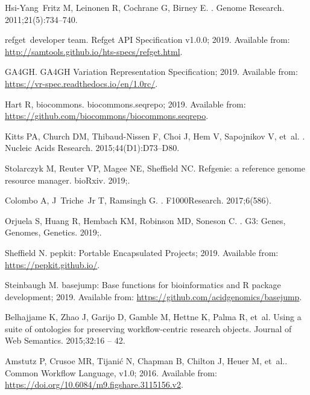 \documentclass[10pt,letterpaper]{article}
\begin{document}
\begin{thebibliography}{10}
Hsi-Yang~Fritz M, Leinonen R, Cochrane G, Birney E.
.
\newblock Genome Research. 2011;21(5):734--740.

refget~developer team. {Refget API Specification v1.0.0}; 2019.
\newblock Available from:
  \url{http://samtools.github.io/hts-specs/refget.html}.

GA4GH. {GA4GH Variation Representation Specification}; 2019.
\newblock Available from: \url{https://vr-spec.readthedocs.io/en/1.0rc/}.

Hart R, biocommons. {biocommons.seqrepo}; 2019.
\newblock Available from:
  \url{https://github.com/biocommons/biocommons.seqrepo}.

Kitts PA, Church DM, Thibaud-Nissen F, Choi J, Hem V, Sapojnikov V, et~al.
.
\newblock Nucleic Acids Research. 2015;44(D1):D73--D80.

Stolarczyk M, Reuter VP, Magee NE, Sheffield NC.
\newblock Refgenie: a reference genome resource manager.
\newblock bioRxiv. 2019;.

Colombo A, J~Triche~Jr T, Ramsingh G.
.
\newblock F1000Research. 2017;6(586).

Orjuela S, Huang R, Hembach KM, Robinson MD, Soneson C.
.
\newblock G3: Genes, Genomes, Genetics. 2019;.

Sheffield N. {pepkit: Portable Encapsulated Projects}; 2019.
\newblock Available from: \url{https://pepkit.github.io/}.

Steinbaugh M. {basejump: Base functions for bioinformatics and R package
  development}; 2019.
\newblock Available from: \url{https://github.com/acidgenomics/basejump}.

Belhajjame K, Zhao J, Garijo D, Gamble M, Hettne K, Palma R, et~al.
\newblock Using a suite of ontologies for preserving workflow-centric research
  objects.
\newblock Journal of Web Semantics. 2015;32:16 -- 42.

Amstutz P, Crusoe MR, Tijanić N, Chapman B, Chilton J, Heuer M, et~al..
  {Common Workflow Language, v1.0}; 2016.
\newblock Available from: \url{https://doi.org/10.6084/m9.figshare.3115156.v2}.


\end{thebibliography}
\end{document}
